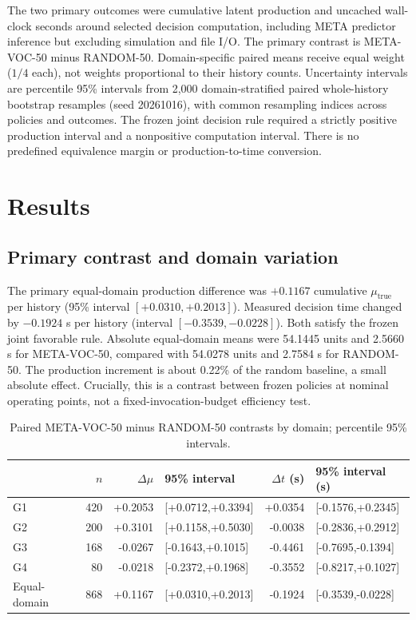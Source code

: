 \documentclass[11pt]{article}
\begin{document}
The two primary outcomes were cumulative latent production and uncached wall-clock seconds around selected decision computation, including META predictor inference but excluding simulation and file I/O. The primary contrast is META-VOC-50 minus RANDOM-50. Domain-specific paired means receive equal weight ($1/4$ each), not weights proportional to their history counts. Uncertainty intervals are percentile 95\% intervals from 2,000 domain-stratified paired whole-history bootstrap resamples (seed 20261016), with common resampling indices across policies and outcomes. The frozen joint decision rule required a strictly positive production interval and a nonpositive computation interval. There is no predefined equivalence margin or production-to-time conversion.

\section{Results}
\subsection{Primary contrast and domain variation}
The primary equal-domain production difference was $+0.1167$ cumulative $\mu_{\mathrm{true}}$ per history (95\% interval $[+0.0310,+0.2013]$). Measured decision time changed by $-0.1924$ s per history (interval $[-0.3539,-0.0228]$). Both satisfy the frozen joint favorable rule. Absolute equal-domain means were 54.1445 units and 2.5660 s for META-VOC-50, compared with 54.0278 units and 2.7584 s for RANDOM-50. The production increment is about 0.22\% of the random baseline, a small absolute effect. Crucially, this is a contrast between frozen policies at nominal operating points, not a fixed-invocation-budget efficiency test.

\begin{table}[ht]\centering\caption{Paired META-VOC-50 minus RANDOM-50 contrasts by domain; percentile 95\% intervals.}\label{tab:effects}\small\begin{tabular}{lrrlrl}\toprule & $n$ & $\Delta\mu$ & 95\% interval & $\Delta t$ (s) & 95\% interval (s)\\\midrule G1 & 420 & +0.2053 & [+0.0712,+0.3394] & +0.0354 & [-0.1576,+0.2345]\\ G2 & 200 & +0.3101 & [+0.1158,+0.5030] & -0.0038 & [-0.2836,+0.2912]\\ G3 & 168 & -0.0267 & [-0.1643,+0.1015] & -0.4461 & [-0.7695,-0.1394]\\ G4 & 80 & -0.0218 & [-0.2372,+0.1968] & -0.3552 & [-0.8217,+0.1027]\\\midrule Equal-domain & 868 & +0.1167 & [+0.0310,+0.2013] & -0.1924 & [-0.3539,-0.0228]\\\bottomrule\end{tabular}\end{table}
\end{document}
